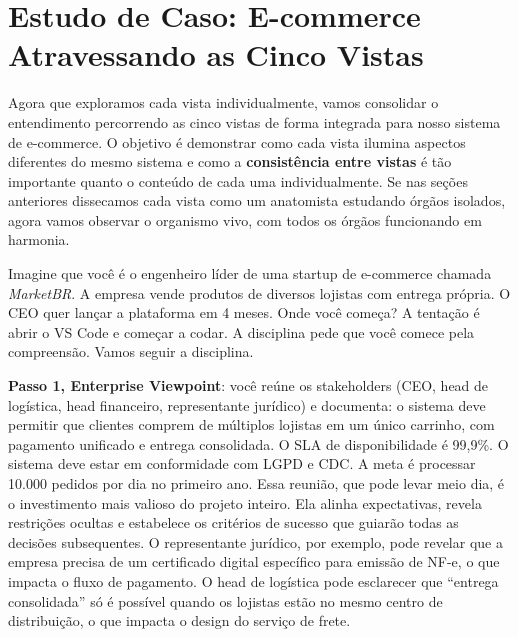 \section{Estudo de Caso: E-commerce Atravessando as Cinco Vistas}

Agora que exploramos cada vista individualmente, vamos consolidar o entendimento
percorrendo as cinco vistas de forma integrada para nosso sistema de e-commerce.
O objetivo é demonstrar como cada vista ilumina aspectos diferentes do mesmo
sistema e como a \textbf{consistência entre vistas} é tão importante quanto o
conteúdo de cada uma individualmente. Se nas seções anteriores dissecamos cada
vista como um anatomista estudando órgãos isolados, agora vamos observar o
organismo vivo, com todos os órgãos funcionando em harmonia.

Imagine que você é o engenheiro líder de uma startup de e-commerce chamada
\emph{MarketBR}. A empresa vende produtos de diversos lojistas com entrega
própria. O CEO quer lançar a plataforma em 4 meses. Onde você começa? A tentação
é abrir o VS Code e começar a codar. A disciplina pede que você comece pela
compreensão. Vamos seguir a disciplina.

\textbf{Passo 1, Enterprise Viewpoint}: você reúne os stakeholders (CEO,
head de logística, head financeiro, representante jurídico) e documenta: o
sistema deve permitir que clientes comprem de múltiplos lojistas em um único
carrinho, com pagamento unificado e entrega consolidada. O SLA de disponibilidade
é 99,9\%. O sistema deve estar em conformidade com LGPD e CDC. A meta é
processar 10.000 pedidos por dia no primeiro ano. Essa reunião, que pode levar
meio dia, é o investimento mais valioso do projeto inteiro. Ela alinha expectativas,
revela restrições ocultas e estabelece os critérios de sucesso que guiarão todas
as decisões subsequentes. O representante jurídico, por exemplo, pode revelar que
a empresa precisa de um certificado digital específico para emissão de NF-e, o que
impacta o fluxo de pagamento. O head de logística pode esclarecer que ``entrega
consolidada'' só é possível quando os lojistas estão no mesmo centro de
distribuição, o que impacta o design do serviço de frete.

